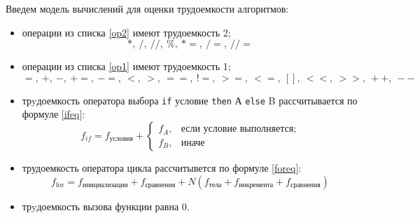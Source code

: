 Введем модель вычислений для оценки трудоемкости алгоритмов:
\begin{itemize}[left=\parindent]
    \item операции из списка \ref{op2} имеют трудоемкость 2;
        \begin{equation}\label{op2}
            *,~/,~//,~\%,~*=,~/=,~//=
        \end{equation}

    \item операции из списка \ref{op1} имеют трудоемкость 1;
        \begin{equation}\label{op1}
            =,~+,~-,~+=,~-=,~<,~>,~==,~!=,~>=,~<=,~[],~<<,~>>,~++,~--
        \end{equation}

    \item трyдоемкость оператора выбора \texttt{if} условие \texttt{then} А
        \texttt{else} B рассчитывается по формуле \ref{ifeq}:
        \begin{equation}\label{ifeq}
            f_{if} = f_{условия} +
            \begin{cases}
                f_A, & \text{если условие выполняется;}\\
                f_B, & \text{иначе}
            \end{cases}
        \end{equation}

    \item трудоемкость оператора цикла рассчитывется по формуле \ref{foreq}:
        \begin{equation}\label{foreq}
            f_{\text{for}} = f_{\text{инициализации}} + f_{\text{сравнения}} +
                      N(f_{\text{тела}} + f_{\text{инкремента}} +
                      f_{\text{сравнения}})
        \end{equation}

    \item трyдоемкость вызова функции равна 0.
\end{itemize}

\subsection{}

\subsection{}

\subsection{}

